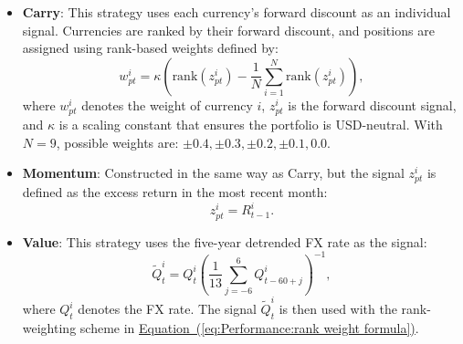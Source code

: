 \documentclass[12pt,oneside,letter]{article}
\newcommand*{\myeq}[1]{\hyperref[{#1}]{Equation~(\ref*{#1})}}
\begin{document}
\begin{appendices}
		\begin{itemize}
			\item \textbf{Carry}: This strategy uses each currency’s forward discount as an individual signal. Currencies are ranked by their forward discount, and positions are assigned using rank-based weights defined by:
			\begin{equation}
				w_{pt}^i = \kappa \left( \text{rank}(z_{pt}^i) - \frac{1}{N} \sum_{i=1}^N \text{rank}(z_{pt}^i) \right),
				\label{eq:Performance:rank weight formula}
			\end{equation}
			where \( w_{pt}^i \) denotes the weight of currency \( i \), \( z_{pt}^i \) is the forward discount signal, and \( \kappa \) is a scaling constant that ensures the portfolio is USD-neutral. With \( N = 9 \), possible weights are: \( \pm 0.4, \pm 0.3, \pm 0.2, \pm 0.1, 0.0 \).
			\item \textbf{Momentum}: Constructed in the same way as Carry, but the signal \( z_{pt}^i \) is defined as the excess return in the most recent month:
			\[
			z_{pt}^i = R_{t-1}^i.
			\]
			\item \textbf{Value}: This strategy uses the five-year detrended FX rate as the signal:
			\begin{equation}
				\widetilde{Q}_t^i = Q_t^i \left( \frac{1}{13} \sum_{j=-6}^{6} Q_{t-60+j}^i \right)^{-1},
				\label{eq:Performance:value strategy definition}
			\end{equation}
			where \( Q_t^i \) denotes the FX rate. The signal \( \widetilde{Q}_t^i \) is then used with the rank-weighting scheme in \myeq{eq:Performance:rank weight formula}.
		\end{itemize}
		

\end{appendices}
\end{document}
